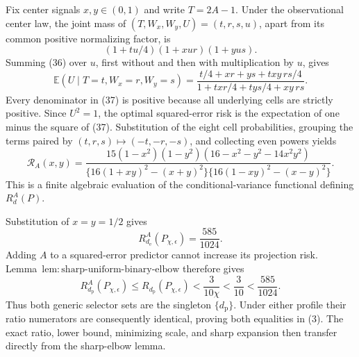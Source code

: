 Fix center signals \(x,y\in(0,1)\) and write \(T=2A-1\). Under the observational center law, the joint mass of \((T,W_x,W_y,U)=(t,r,s,u)\), apart from its common positive normalizing factor, is
\[
 (1+tu/4)(1+xur)(1+yus).                                  \tag{36}
\]
Summing (36) over \(u\), first without and then with multiplication by \(u\), gives
\[
 \mathbb E(U\mid T=t,W_x=r,W_y=s)
 =\frac{t/4+xr+ys+txy\,rs/4}
 {1+txr/4+tys/4+xy\,rs}.                                  \tag{37}
\]
Every denominator in (37) is positive because all underlying cells are strictly positive. Since \(U^2=1\), the optimal squared-error risk is the expectation of one minus the square of (37). Substitution of the eight cell probabilities, grouping the terms paired by \((t,r,s)\mapsto(-t,-r,-s)\), and collecting even powers yields
\[
 \mathcal R_A(x,y)=
 \frac{15(1-x^2)(1-y^2)(16-x^2-y^2-14x^2y^2)}
 {\{16(1+xy)^2-(x+y)^2\}\{16(1-xy)^2-(x-y)^2\}}.         \tag{38}
\]
This is a finite algebraic evaluation of the conditional-variance functional defining \(R_d^A(P)\).

Substitution of \(x=y=1/2\) gives
\[
 R_{d_{\mathrm e}}^A(P_{\chi,\epsilon})=\frac{585}{1024}.
\]
Adding \(A\) to a squared-error predictor cannot increase its projection risk. Lemma~\(\mathrm{lem{:}sharp\text{-}uniform\text{-}binary\text{-}elbow}\) therefore gives
\[
 R_{d_{\mathrm p}}^A(P_{\chi,\epsilon})
 \le R_{d_{\mathrm p}}(P_{\chi,\epsilon})
 <\frac{3}{10\chi}<\frac{3}{10}<\frac{585}{1024}.         \tag{39}
\]
Thus both generic selector sets are the singleton \(\{d_{\mathrm p}\}\). Under either profile their ratio numerators are consequently identical, proving both equalities in (3). The exact ratio, lower bound, minimizing scale, and sharp expansion then transfer directly from the sharp-elbow lemma.